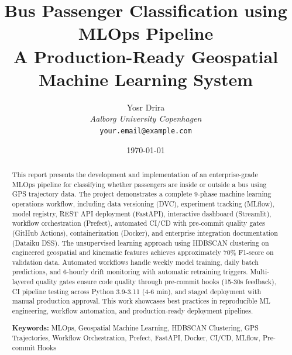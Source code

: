 \documentclass[12pt,a4paper]{article}
\title{
    \Large{\textbf{Bus Passenger Classification using MLOps Pipeline}} \\
    \vspace{0.5cm}
    \large{A Production-Ready Geospatial Machine Learning System}
}
\author{
    Yosr Drira \\
    \textit{Aalborg University Copenhagen} \\
    \texttt{your.email@example.com}
}
\date{\today}
\begin{document}
\maketitle
\thispagestyle{empty}

\begin{abstract}
This report presents the development and implementation of an enterprise-grade MLOps pipeline for classifying whether passengers are inside or outside a bus using GPS trajectory data. The project demonstrates a complete 9-phase machine learning operations workflow, including data versioning (DVC), experiment tracking (MLflow), model registry, REST API deployment (FastAPI), interactive dashboard (Streamlit), workflow orchestration (Prefect), automated CI/CD with pre-commit quality gates (GitHub Actions), containerization (Docker), and enterprise integration documentation (Dataiku DSS). The unsupervised learning approach using HDBSCAN clustering on engineered geospatial and kinematic features achieves approximately 70\% F1-score on validation data. Automated workflows handle weekly model training, daily batch predictions, and 6-hourly drift monitoring with automatic retraining triggers. Multi-layered quality gates ensure code quality through pre-commit hooks (15-30s feedback), CI pipeline testing across Python 3.9-3.11 (4-6 min), and staged deployment with manual production approval. This work showcases best practices in reproducible ML engineering, workflow automation, and production-ready deployment pipelines.

\vspace{0.3cm}
\noindent\textbf{Keywords:} MLOps, Geospatial Machine Learning, HDBSCAN Clustering, GPS Trajectories, Workflow Orchestration, Prefect, FastAPI, Docker, CI/CD, MLflow, Pre-commit Hooks
\end{abstract}

\newpage

\tableofcontents
\newpage












\appendix

\end{document}
